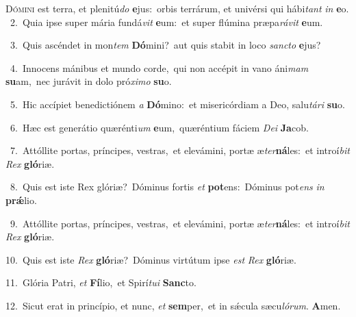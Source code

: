 \lettrine{\initial\textcolor{\initialcolor}{D}}{ómini} est terra, et plenitú\textit{do} \textbf{e}\-jus:~\star orbis terrárum, et univérsi qui hábi\textit{tant} \textit{in} \textbf{e}\-o.\\
{\numbfont\textcolor{\numbcolor}{~2.}}~Quia ipse super mária fundá\textit{vit} \textbf{e}\-um:~\star et super flúmina præpa\-\textit{rá}\-\textit{vit} \textbf{e}\-um.\par
{\numbfont\textcolor{\numbcolor}{~3.}}~Quis ascéndet in mon\textit{tem} \textbf{Dó}\-mini?~\star aut quis stabit in loco \textit{sanc}\-\textit{to} \textbf{e}\-jus?\par
{\numbfont\textcolor{\numbcolor}{~4.}}~Innocens mánibus et mundo corde,~\dagger qui non accépit in vano áni\textit{mam} \textbf{su}\-am,~\star nec jurávit in dolo pró\-\textit{xi}\-\textit{mo} \textbf{su}\-o.\par
{\numbfont\textcolor{\numbcolor}{~5.}}~Hic accípiet benedictiónem \textit{a} \textbf{Dó}\-mino:~\star et misericórdiam a Deo, salu\-\textit{tá}\-\textit{ri} \textbf{su}\-o.\par
{\numbfont\textcolor{\numbcolor}{~6.}}~Hæc est generátio quærénti\textit{um} \textbf{e}\-um,~\star quæréntium fáciem \textit{De}\-\textit{i} \textbf{Ja}\-cob.\par
{\numbfont\textcolor{\numbcolor}{~7.}}~Attóllite portas, príncipes, vestras,~\dagger et elevámini, portæ æ\-\textit{ter}\-\textbf{ná}les:~\star et introí\textit{bit} \textit{Rex} \textbf{gló}\-riæ.\par
{\numbfont\textcolor{\numbcolor}{~8.}}~Quis est iste Rex glóriæ?~\dagger Dóminus fortis \textit{et} \textbf{pot}\-ens:~\star Dóminus pot\textit{ens} \textit{in} \textbf{prǽ}\-lio.\par
{\numbfont\textcolor{\numbcolor}{~9.}}~Attóllite portas, príncipes, vestras,~\dagger et elevámini, portæ æ\-\textit{ter}\-\textbf{ná}les:~\star et introí\textit{bit} \textit{Rex} \textbf{gló}\-riæ.\par
{\numbfont\textcolor{\numbcolor}{10.}}~Quis est iste \textit{Rex} \textbf{gló}\-riæ?~\star Dóminus virtútum ipse \textit{est} \textit{Rex} \textbf{gló}\-riæ.\par
{\numbfont\textcolor{\numbcolor}{11.}}~Glória Patri, \textit{et} \textbf{Fí}\-lio,~\star et Spirí\-\textit{tu}\-\textit{i} \textbf{Sanc}\-to.\par
{\numbfont\textcolor{\numbcolor}{12.}}~Sicut erat in princípio, et nunc, \textit{et} \textbf{sem}\-per,~\star et in sǽcula sæcu\-\textit{ló}\-\textit{rum}. \textbf{A}\-men.\par
